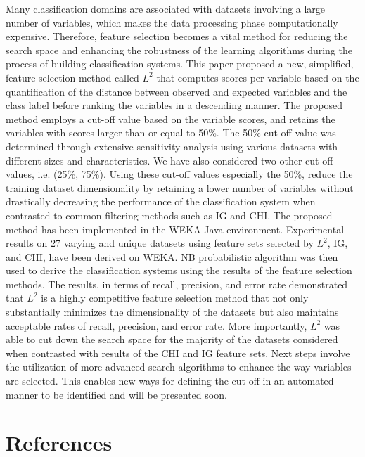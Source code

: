 \documentclass[review]{elsarticle}
\begin{document}
Many classification domains are associated with datasets involving a large number of variables, which makes the data processing phase computationally expensive. Therefore, feature selection becomes a vital method for reducing the search space and enhancing the robustness of the learning algorithms during the process of building classification systems. This paper proposed a new, simplified, feature selection method called $ L^2 $ that computes scores per variable based on the quantification of the distance between observed and expected variables and the class label before ranking the variables in a descending manner. The proposed method employs a cut-off value based on the variable scores, and retains the variables with scores larger than or equal to 50\%. The 50\% cut-off value was determined through extensive sensitivity analysis using various datasets with different sizes and characteristics. We have also considered two other cut-off values, i.e. (25\%, 75\%). Using these cut-off values especially the 50\%, reduce the training dataset dimensionality by retaining a lower number of variables without drastically decreasing the performance of the classification system when contrasted to common filtering methods such as IG and CHI.  The proposed method has been implemented in the WEKA Java environment. Experimental results on 27 varying and unique datasets using feature sets selected by $ L^2 $, IG, and CHI, have been derived on WEKA. NB probabilistic algorithm was then used to derive the classification systems using the results of the feature selection methods. The results, in terms of recall, precision, and error rate demonstrated that $ L^2 $ is a highly competitive feature selection method that not only substantially minimizes the dimensionality of the datasets but also maintains acceptable rates of recall, precision, and error rate. More importantly, $ L^2 $ was able to cut down the search space for the majority of the datasets considered when contrasted with results of the CHI and IG feature sets.  Next steps involve the utilization of more advanced search algorithms to enhance the way variables are selected.  This enables new ways for defining the cut-off in an automated manner to be identified and will be presented soon.  


\section*{References}


\end{document}
